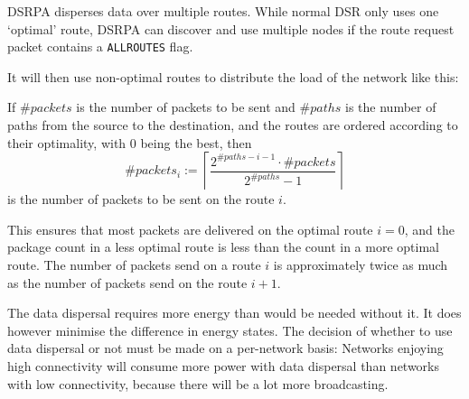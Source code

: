 DSRPA disperses data over multiple routes.  While normal DSR only uses one
`optimal' route, DSRPA can discover and use multiple nodes if the route request
packet contains a \texttt{ALLROUTES} flag.

It will then use non-optimal routes to distribute the load of the network like
this:

If $\#packets$ is the number of packets to be sent and
$\#paths$ is the number of paths from the source to the
destination, and the routes are ordered according to their optimality,
with 0 being the best, then
\[ \#packets_{i} := \left\lceil \frac{2^{\# paths - i - 1} \cdot \# packets}{2^{\#paths} - 1} \right\rceil \]
is the number of packets to be sent on the route $i$.

This ensures that most packets are delivered on the optimal route $i=0$, and
the package count in a less optimal route is less than the count in a more
optimal route. The number of packets send on a route $i$ is approximately
twice as much as the number of packets send on the route $i+1$.

The data dispersal requires more energy than would be needed without it. It
does however minimise the difference in energy states. The decision of whether
to use data dispersal or not must be made on a per-network basis: Networks
enjoying high connectivity will consume more power with data dispersal than
networks with low connectivity, because there will be a lot more broadcasting.
